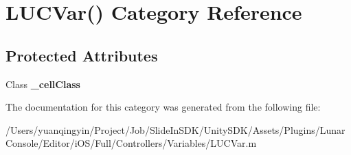 \hypertarget{category_l_u_c_var_07_08}{}\section{L\+U\+C\+Var() Category Reference}
\label{category_l_u_c_var_07_08}
\subsection*{Protected Attributes}
\begin{DoxyCompactItemize}
\item 
\mbox{\label{category_l_u_c_var_07_08_a471471d8ae379133675e173b3bdb11c4}} 
Class {\bfseries \+\_\+cell\+Class}
\end{DoxyCompactItemize}


The documentation for this category was generated from the following file\+:\begin{DoxyCompactItemize}
\item 
/\+Users/yuanqingyin/\+Project/\+Job/\+Slide\+In\+S\+D\+K/\+Unity\+S\+D\+K/\+Assets/\+Plugins/\+Lunar\+Console/\+Editor/i\+O\+S/\+Full/\+Controllers/\+Variables/L\+U\+C\+Var.\+m\end{DoxyCompactItemize}
